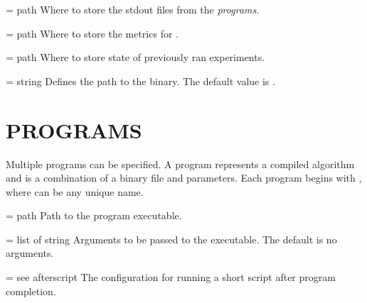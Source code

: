 \documentclass[a4paper,english]{article}
\begin{document}
\begin{adjustwidth}{18pt}{0pt}
    \begin{Description}[Options]\setlength{\itemsep}{0cm}
        \item[\Opt{output\_path} = path]
            Where to store the stdout files from the \emph{programs}.
        \item[\Opt{metrics\_path} = path]
          Where to store the metrics for  .
        \item[\Opt{experiments\_folder} = path]
            Where to store state of previously ran experiments.
        \item[\Opt{wrapper?} = string]
            Defines the path to the  binary.
            The default value is .
    \end{Description}


%
%


    \section{PROGRAMS}

      Multiple programs can be specified.
      A program represents a compiled algorithm and is a combination of a binary file and parameters.
      Each program begins with , where  can be any unique name.

      \begin{Description}[Options]\setlength{\itemsep}{0cm}
          \item[\Opt{binary} = path]
            Path to the program executable.
          \item[\Opt{arguments?} = list of string]
            Arguments to be passed to the executable.
            The default is no arguments.
          \item[\Opt{afterscript?} = see afterscript]
            The configuration for running a short script after program completion.
      \end{Description}


\end{adjustwidth}
\end{document}
